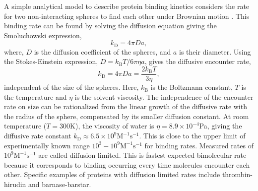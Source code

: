 \documentclass[../talant.diss.submit.tex]{subfiles}
\begin{document}
A simple analytical model to describe protein binding kinetics considers the rate
for two non-interacting spheres to find each other under Brownian motion
\cite{janin:97,szabo:82s,northrup:84b}.  This binding rate can be found by
solving the diffusion equation giving the Smoluchowski expression,
%
\begin{equation}
  \label{eq:smoluch}
  k_{\mathrm{D}} = 4\pi D a, 
\end{equation}
%
where, $D$ is the diffusion coefficient of the spheres, and $a$ is their diameter.
Using the Stokes-Einstein expression, $D =  k_{\mathrm{B}}T/ 6\pi \eta a$,
gives the diffusive encounter rate,
%
\begin{equation}
  \label{eq:smoluch}
  k_{\mathrm{D}} = 4\pi D a = \frac{2k_{\mathrm{B}}T}{3\eta},
\end{equation}
%
independent of the size of the spheres. Here, $k_{\mathrm{B}}$ is the Boltzmann
constant, $T$ is the temperature and $\eta$ is the solvent viscosity.  The
independence of the encounter rate on size can be rationalized from the linear
growth of the diffusive rate with the radius of the sphere, compensated by its
smaller diffusion constant. At room temperature ($T=300$K), the viscosity of
water is $\eta =8.9 \times 10^{-4}$Pa, giving the diffusive rate constant
$k_{\mathrm{D}} \approx 6.5 \times 10^{9} \mathrm{M}^{-1}\mathrm{s}^{-1}$.  This
is close to the upper limit of experimentally known range
$10^{3}-10^{9} \mathrm{M}^{-1}\mathrm{s}^{-1}$ for binding rates.  Measured
rates of $10^{9} \mathrm{M}^{-1}\mathrm{s}^{-1}$ are called diffusion
limited. This is fastest expected bimolecular rate because it corresponds to
binding occurring every time molecules encounter each other.  Specific examples
of proteins with diffusion limited rates include
thrombin-hirudin\cite{stone:89q} and barnase-barstar\cite{schreiber:96r}.
\end{document}
